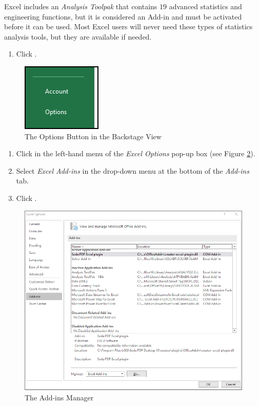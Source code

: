 Excel includes an \textit{Analysis Toolpak} that contains $ 19 $ advanced statistics and engineering functions, but it is considered an Add-in and must be activated before it can be used. Most Excel users will never need these types of statistics analysis tools, but they are available if needed.

\begin{enumerate}
	\item Click .
\end{enumerate}

\begin{figure}[H]
	\centering
	\includegraphics[width=\maxwidth{.50\linewidth}]{gfx/ch09_fig50}
	\caption{The Options Button in the Backstage View}
	\label{09:fig50}
\end{figure}

\begin{enumerate}[resume]	
	
	\item Click  in the left-hand menu of the \textit{Excel Options} pop-up box (see Figure \ref{09:fig51}).
	\item Select \textit{Excel Add-ins} in the drop-down menu at the bottom of the \textit{Add-ins} tab.
	\item Click .
	
\end{enumerate}

\begin{figure}[H]
	\centering
	\includegraphics[width=\maxwidth{.95\linewidth}]{gfx/ch09_fig51}
	\caption{The Add-ins Manager}
	\label{09:fig51}
\end{figure}

